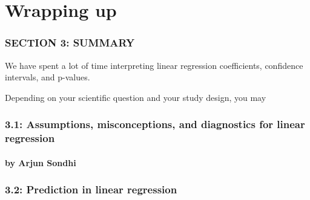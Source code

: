 \documentclass[12pt, 
hyperref={colorlinks=true, linkcolor=blue, urlcolor=cyan}]{beamer}
\begin{document}
\section{Wrapping up}
\begin{frame}
\frametitle{SECTION 3: SUMMARY}

We have spent a lot of time interpreting linear regression coefficients, confidence intervals, and p-values.

Depending on your scientific question and your study design, you may  
\end{frame}

\begin{frame}
\frametitle{3.1: Assumptions, misconceptions, and diagnostics for linear regression}
\framesubtitle{by Arjun Sondhi}
\end{frame}

\begin{frame}
\frametitle{3.2: Prediction in linear regression}
\end{frame}
\end{document}
